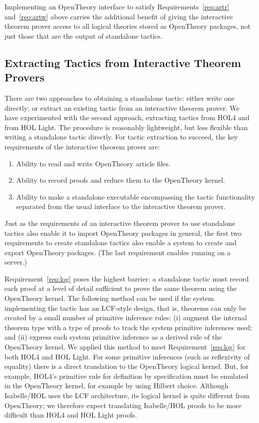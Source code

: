 \documentclass{llncs}
\newcommand{\OpenTheory}{OpenTheory\xspace}
\begin{document}
Implementing an \OpenTheory interface to satisfy Requirements~\ref{req:artr} and~\ref{req:artw} above carries the additional benefit of giving the interactive theorem prover access to all logical theories stored as \OpenTheory packages, not just those that are the output of standalone tactics.

\subsection{Extracting Tactics from Interactive Theorem Provers}

There are two approaches to obtaining a standalone tactic: either write one directly; or extract an existing tactic from an interactive theorem prover.
We have experimented with the second approach, extracting tactics from HOL4 and from HOL Light.
The procedure is reasonably lightweight, but less flexible than writing a standalone tactic directly.
For tactic extraction to succeed, the key requirements of the interactive theorem prover are:
\begin{enumerate}
\item\label{req:io} Ability to read and write \OpenTheory article files.

\item\label{req:log} Ability to record proofs and reduce them to the \OpenTheory kernel.

\item\label{req:ckpt} Ability to make a standalone executable encompassing the tactic functionality separated from the usual interface to the interactive theorem prover.
\end{enumerate}

Just as the requirements of an interactive theorem prover to use standalone tactics also enable it to import \OpenTheory packages in general, the first two requirements to create standalone tactics also enable a system to create and export \OpenTheory packages.
(The last requirement enables running on a server.)

Requirement~\ref{req:log} poses the highest barrier: a standalone tactic must record each proof at a level of detail sufficient to prove the same theorem using the \OpenTheory kernel.
The following method can be used if the system implementing the tactic has an LCF-style design, that is, theorems can only be created by a small number of primitive inference rules: (i) augment the internal theorem type with a type of proofs to track the system primitive inferences used; and (ii) express each system primitive inference as a derived rule of the \OpenTheory kernel. We applied this method to meet Requirement~\ref{req:log} for both HOL4 and HOL Light. For some primitive inferences (such as reflexivity of equality) there is a direct translation to the \OpenTheory logical kernel.
But, for example, HOL4's primitive rule for definition by specification must be emulated in the \OpenTheory kernel, for example by using Hilbert choice.
Although Isabelle/HOL uses the LCF architecture, its logical kernel is quite different from \OpenTheory; we therefore expect translating Isabelle/HOL proofs to be more difficult than HOL4 and HOL Light proofs.
\end{document}
